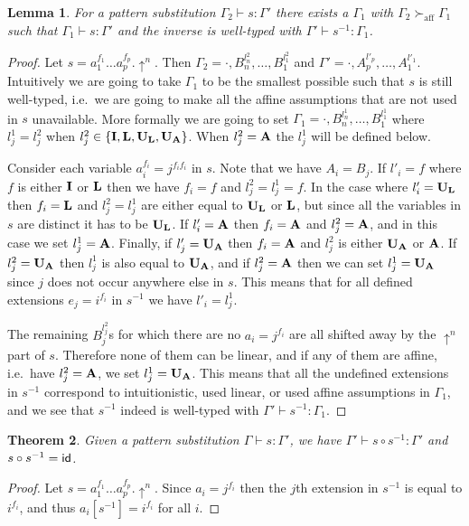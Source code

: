 \documentclass{eptcs}
\newcommand\fI{\textup{$\mathbf{I}$}}
\newcommand\fA{\textup{$\mathbf{A}$}}
\newcommand\fL{\textup{$\mathbf{L}$}}
\newcommand\fUA{{\textup{\textbf{U}}_\textup{\textbf{A}}}}
\newcommand\fUL{{\textup{\textbf{U}}_\textup{\textbf{L}}}}
\newcommand{\affweak}{\succ_\mathrm{aff}}
\newtheorem{thm}{Theorem}[section]
\newtheorem{lem}[thm]{Lemma}
\theoremstyle{definition}
\begin{document}
\begin{lem}
For a pattern substitution $\Gamma_2\vdash s:\Gamma'$ there exists a
$\Gamma_1$ with $\Gamma_2\affweak\Gamma_1$ such that
$\Gamma_1\vdash s:\Gamma'$ and the inverse is well-typed with
$\Gamma'\vdash s^{-1}:\Gamma_1$.
\end{lem}
\begin{proof}
Let $s=a_1^{f_1}\ldots a_p^{f_p}.\uparrow^n$.
Then $\Gamma_2=\cdot,B_n^{l^2_n},\ldots,B_1^{l^2_1}$
and $\Gamma'=\cdot,A_p^{l'_p},\ldots,A_1^{l'_1}$.  Intuitively we are
going to take $\Gamma_1$ to be the smallest possible such that $s$ is
still well-typed, i.e.\ we are going to make all the affine assumptions
that are not used in $s$ unavailable.  More formally we are going to set
$\Gamma_1=\cdot,B_n^{l^1_n},\ldots,B_1^{l^1_1}$ where $l^1_j=l^2_j$
when $l^2_j\in\{\fI,\fL,\fUL,\fUA\}$.  When $l^2_j=\fA$ the $l^1_j$ will
be defined below.

Consider each variable $a_i^{f_i}=j^{f_i f_i}$ in $s$.
Note that we have $A_i=B_j$.
If $l'_i=f$ where $f$ is either $\fI$ or $\fL$ then we have
$f_i=f$ and $l^2_j=l^1_j=f$.
In the case where $l'_i=\fUL$ then $f_i=\fL$ and $l^2_j=l^1_j$
are either equal to $\fUL$ or $\fL$, but since all the variables in $s$
are distinct it has to be $\fUL$.
If $l'_i=\fA$ then $f_i=\fA$ and $l^2_j=\fA$, and in this case we set
$l^1_j=\fA$.
Finally, if $l'_j=\fUA$ then $f_i=\fA$ and $l^2_j$ is either $\fUA$ or
$\fA$.  If $l^2_j=\fUA$ then $l^1_j$ is also equal to $\fUA$, and if
$l^2_j=\fA$ then we can set $l^1_j=\fUA$ since $j$ does not occur
anywhere else in $s$.  This means that for all defined extensions
$e_j=i^{f_i}$ in $s^{-1}$ we have $l'_i=l^1_j$.

The remaining $B_j^{l^2_j}$s for which there are no $a_i=j^{f_i}$ are
all shifted away by the $\uparrow^n$ part of $s$.  Therefore none of them
can be linear, and if any of them are affine, i.e.\ have $l^2_j=\fA$,
we set $l^1_j=\fUA$.
This means that all the undefined extensions in $s^{-1}$ correspond to
intuitionistic, used linear, or used affine assumptions in $\Gamma_1$,
and we see that 
$s^{-1}$ indeed is well-typed with $\Gamma'\vdash s^{-1}:\Gamma_1$.
\end{proof}
\begin{thm}\label{thm:inverse}
Given a pattern substitution $\Gamma\vdash s:\Gamma'$, we have
$\Gamma'\vdash s\circ s^{-1}:\Gamma'$ and
$s\circ s^{-1}=\textup{\textsf{id}}$.
\end{thm}
\begin{proof}
Let $s=a_1^{f_1}\ldots a_p^{f_p}.\uparrow^n$.
Since $a_i=j^{f_i}$ then the $j$th extension in $s^{-1}$ is equal to
$i^{f_i}$, and thus $a_i[s^{-1}] = i^{f_i}$ for all $i$.
\end{proof}
\end{document}
